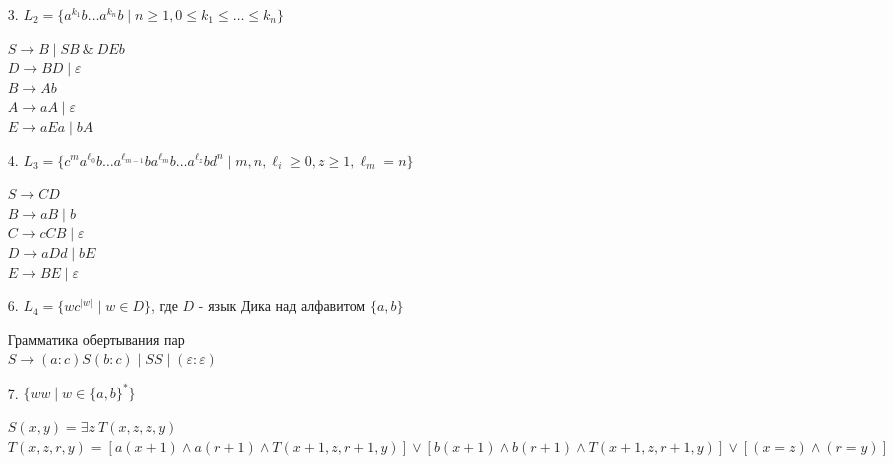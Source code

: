 \documentclass[10pt]{article}
\newcommand{\eps}{\varepsilon}
\begin{document}
\begin{enumerate}
	\item[3.] $L_2=\{ a^{k_1} b \ldots a^{k_n} b \mid n \geqslant 1, 0 \leqslant k_1 \leqslant \ldots \leqslant k_n \}$
		
		$S \to B \mid SB\ \&\ DEb$ \\
		$D \to BD \mid \eps$ \\
		$B \to Ab$ \\
		$A \to aA \mid \eps$ \\
		$E \to aEa \mid bA$
	
	\item[4.] $L_3=\{c^m a^{\ell_0}b \ldots a^{\ell_{m-1}}b a^{\ell_m}b \ldots a^{\ell_z}b d^n \mid m,n, \ell_i \geqslant 0, z \geqslant 1, \ell_m=n\}$
	
		$S \to CD$ \\
		$B \to aB \mid b$ \\
		$C \to cCB \mid \eps$ \\
		$D \to aDd \mid bE$ \\
		$E \to BE \mid \eps$
	
	\item[6.] $L_4 = \{wc^{|w|} \mid w \in D\}$, где $D$ - язык Дика над алфавитом $\{a, b\}$
	
		Грамматика обертывания пар \\
		$S \to (a : c) S (b : c) \mid SS \mid (\eps:\eps)$
	
	\item[7.] $\{ww \mid w \in \{a, b\}^*\}$
	
		$S(x, y) = \exists z\ T(x, z, z, y)$ \\
		$T(x, z, r, y) = \left[ a(x+1) \land a(r+1) \land T(x+1, z, r+1, y)\right] \mathrel{\lor} \left[ b(x+1) \land b(r+1) \land T(x+1, z, r+1, y) \right] \mathrel{\lor} \left[ (x=z) \land (r=y)\right]$
\end{enumerate}
\end{document}
